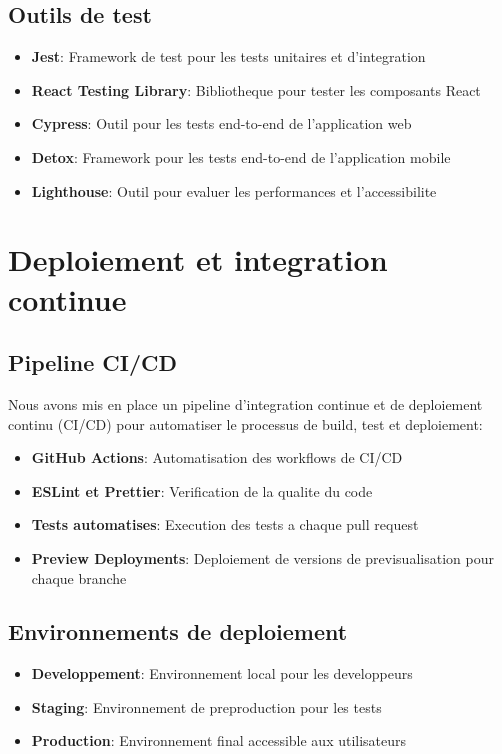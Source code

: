 \subsection{Outils de test}
\begin{itemize}
    \item \textbf{Jest}: Framework de test pour les tests unitaires et d'integration
    \item \textbf{React Testing Library}: Bibliotheque pour tester les composants React
    \item \textbf{Cypress}: Outil pour les tests end-to-end de l'application web
    \item \textbf{Detox}: Framework pour les tests end-to-end de l'application mobile
    \item \textbf{Lighthouse}: Outil pour evaluer les performances et l'accessibilite
\end{itemize}

\section{Deploiement et integration continue}
\subsection{Pipeline CI/CD}
Nous avons mis en place un pipeline d'integration continue et de deploiement continu (CI/CD) pour automatiser le processus de build, test et deploiement:

\begin{itemize}
    \item \textbf{GitHub Actions}: Automatisation des workflows de CI/CD
    \item \textbf{ESLint et Prettier}: Verification de la qualite du code
    \item \textbf{Tests automatises}: Execution des tests a chaque pull request
    \item \textbf{Preview Deployments}: Deploiement de versions de previsualisation pour chaque branche
\end{itemize}

\subsection{Environnements de deploiement}
\begin{itemize}
    \item \textbf{Developpement}: Environnement local pour les developpeurs
    \item \textbf{Staging}: Environnement de preproduction pour les tests
    \item \textbf{Production}: Environnement final accessible aux utilisateurs
\end{itemize}

